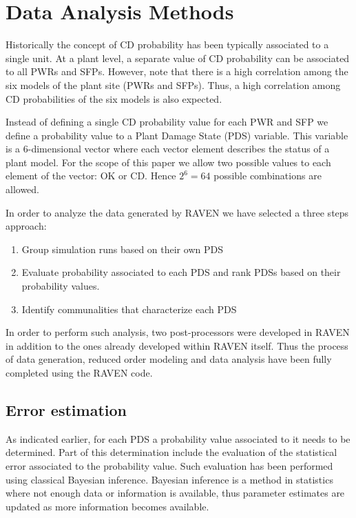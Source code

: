 \section{Data Analysis Methods}
\label{sec:plantAnalysisResults}

Historically the concept of CD probability has been typically 
associated to a single unit. At a plant level, a separate value of CD 
probability can be associated to all PWRs and SFPs. However, note that there 
is a high correlation among the six models of the plant site (PWRs and SFPs). 
Thus, a high correlation among CD probabilities of the six models is also expected.

Instead of defining a single CD probability value for each PWR and SFP 
we define a probability value to a Plant Damage State (PDS) variable. This 
variable is a $6$-dimensional vector where each vector element describes the 
status of a plant model. For the scope of this paper we allow two possible 
values to each element of the vector: OK or CD. Hence $2^6=64$ possible 
combinations are allowed.

In order to analyze the data generated by RAVEN we have selected a three steps 
approach:
\begin{enumerate}
  \item Group simulation runs based on their own PDS  
  \item Evaluate probability associated to each PDS and rank PDSs based on 
        their probability values.
  \item Identify communalities that characterize each PDS
\end{enumerate}

In order to perform such analysis, two post-processors were developed in RAVEN in 
addition to the ones already developed within RAVEN itself.
Thus the process of data generation, reduced order modeling and data analysis 
have been fully completed using the RAVEN code.

\subsection{Error estimation}
As indicated earlier, for each PDS a probability value associated to it needs to be 
determined. Part of this determination include the evaluation of the statistical error
associated to the probability value. Such evaluation has been performed using classical
Bayesian inference.
Bayesian inference is a method in statistics where not enough data or information is 
available, thus parameter estimates are updated as more information becomes available. 

